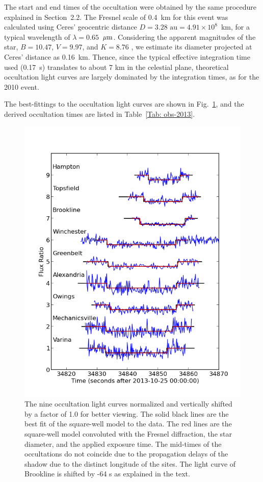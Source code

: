 \documentclass[useAMS,usenatbib]{mn2e}
\begin{document}
The start and end times of the occultation were obtained by the same procedure explained in Section~2.2. The Fresnel scale of 0.4~km for this event was calculated using Ceres' geocentric distance $D = 3.28 \text{ au} = 4.91 \times 10^{8}$~km, for a typical wavelength of $\lambda = 0.65$~$\hbox{$\mu$m}$. Considering the apparent magnitudes of the star, $B = 10.47$, $V=9.97$, and $K=8.76$ \citep{Hog2000}, we estimate its diameter projected at Ceres' distance as 0.16~km. Thence, since the typical effective integration time used (0.17~s) translates to about 7 km in the celestial plane, theoretical occultation light curves are largely dominated by the integration times, as for the 2010 event.

The best-fittings to the occultation light curves are shown in Fig.~\ref{Fig: Ceres-2013-curves}, and the derived occultation times are listed in Table~\ref{Tab: obs-2013}.

\begin{figure}
\includegraphics[scale=0.58]{figures/Ceres_2013_fluxratio} 
\caption{The nine occultation light curves normalized and vertically shifted by a factor of 1.0 for better viewing. The solid black lines are the best fit of the square-well model to the data. The red lines are the square-well model convoluted with the Fresnel diffraction, the star diameter, and the applied exposure time. The mid-times of the occultations do not coincide due to the propagation delays of the shadow due to the distinct longitude of the sites. The light curve of Brookline is shifted by -64 s as explained in the text. \label{Fig: Ceres-2013-curves}}
\end{figure}
\end{document}
